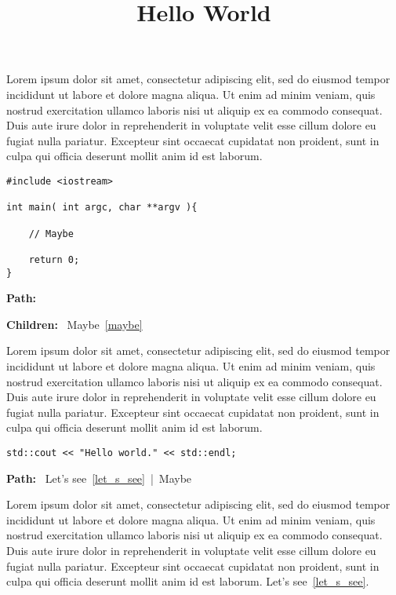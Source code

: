 \documentclass{article}
\title{Hello World}
\begin{document}
\maketitle

Lorem ipsum dolor sit amet, consectetur adipiscing elit, sed do eiusmod tempor incididunt ut labore et dolore magna aliqua. Ut enim ad minim veniam, quis nostrud exercitation ullamco laboris nisi ut aliquip ex ea commodo consequat. Duis aute irure dolor in reprehenderit in voluptate velit esse cillum dolore eu fugiat nulla pariatur. Excepteur sint occaecat cupidatat non proident, sunt in culpa qui officia deserunt mollit anim id est laborum.

\begin{lstlisting}[label=let_s_see,caption=Let's see,frame=tb]
#include <iostream>

int main( int argc, char **argv ){

    // Maybe

    return 0;
}

\end{lstlisting}
\begin{flushright}
\noindent\textbf{Path:}~

\noindent\textbf{Children:}~
Maybe~\ref{maybe}
\end{flushright}
\bigskip

Lorem ipsum dolor sit amet, consectetur adipiscing elit, sed do eiusmod tempor incididunt ut labore et dolore magna aliqua. Ut enim ad minim veniam, quis nostrud exercitation ullamco laboris nisi ut aliquip ex ea commodo consequat. Duis aute irure dolor in reprehenderit in voluptate velit esse cillum dolore eu fugiat nulla pariatur. Excepteur sint occaecat cupidatat non proident, sunt in culpa qui officia deserunt mollit anim id est laborum.

\begin{lstlisting}[label=maybe,caption=Maybe,frame=tb]
    std::cout << "Hello world." << std::endl;

\end{lstlisting}
\begin{flushright}
\noindent\textbf{Path:}~
Let's see~\ref{let_s_see}~|~Maybe\end{flushright}
\bigskip

Lorem ipsum dolor sit amet, consectetur adipiscing elit, sed do eiusmod tempor incididunt ut labore et dolore magna aliqua. Ut enim ad minim veniam, quis nostrud exercitation ullamco laboris nisi ut aliquip ex ea commodo consequat. Duis aute irure dolor in reprehenderit in voluptate velit esse cillum dolore eu fugiat nulla pariatur. Excepteur sint occaecat cupidatat non proident, sunt in culpa qui officia deserunt mollit anim id est laborum. Let's see~\ref{let_s_see}.
\end{document}
